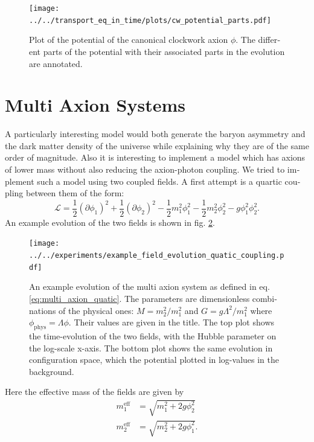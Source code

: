 \documentclass[master,       %
               twoside,        %
               BCOR10mm,       %
               english,ngerman, %
               ]{GAUBM}
\begin{document}
\begin{otherlanguage}{english}
\begin{figure}[H]
	\label{fig:clockwork_potential_parts}
	\texttt{[image: ../../transport\_eq\_in\_time/plots/cw\_potential\_parts.pdf]}
	\caption{Plot of the potential of the canonical clockwork axion $\phi$. The different parts of the potential with their associated parts in the evolution are annotated.}
\end{figure}


\section{Multi Axion Systems}
A particularly interesting model would both generate the baryon asymmetry and the dark matter density of the universe while explaining why they are of the same order of magnitude.
Also it is interesting to implement a model which has axions of lower mass without also reducing the axion-photon coupling.
We tried to implement such a model using two coupled fields.
A first attempt is a quartic coupling between them of the form:
\begin{equation}
	\label{eq:multi_axion_quatic}
	\mathcal{L} = \frac{1}{2} (\partial \phi_1)^2 + \frac{1}{2} (\partial \phi_2)^2 - \frac{1}{2} m_1^2 \phi_1^2 - \frac{1}{2} m_2^2 \phi_2^2 - g \phi_1^2 \phi_2^2.
\end{equation}
An example evolution of the two fields is shown in fig. \ref{fig:multi_axion_quatic_evolution_example}.
\begin{figure}[H]
	\texttt{[image: ../../experiments/example\_field\_evolution\_quatic\_coupling.pdf]}
	\caption{An example evolution of the multi axion system as defined in eq. \eqref{eq:multi_axion_quatic}.
	The parameters are dimensionless combinations of the physical ones: $M = m_2^2 / m_1^2$ and $G = g \Lambda^2 / m_1^2$ where $\phi_\mathrm{phys} = \Lambda \phi$. Their values are given in the title.
	The top plot shows the time-evolution of the two fields, with the Hubble parameter on the log-scale x-axis.
	The bottom plot shows the same evolution in configuration space, which the potential plotted in log-values in the background.
	}
	\label{fig:multi_axion_quatic_evolution_example}
\end{figure}
Here the effective mass of the fields are given by
\begin{align}
	\label{eq:multi_axion_H_osc}
	m_1^\mathrm{eff} &= \sqrt{m_1^2 + 2 g \phi_2^2} \nonumber \\
	m_2^\mathrm{eff} &= \sqrt{m_2^2 + 2 g \phi_1^2}.
\end{align}

\end{otherlanguage}
\end{document}
